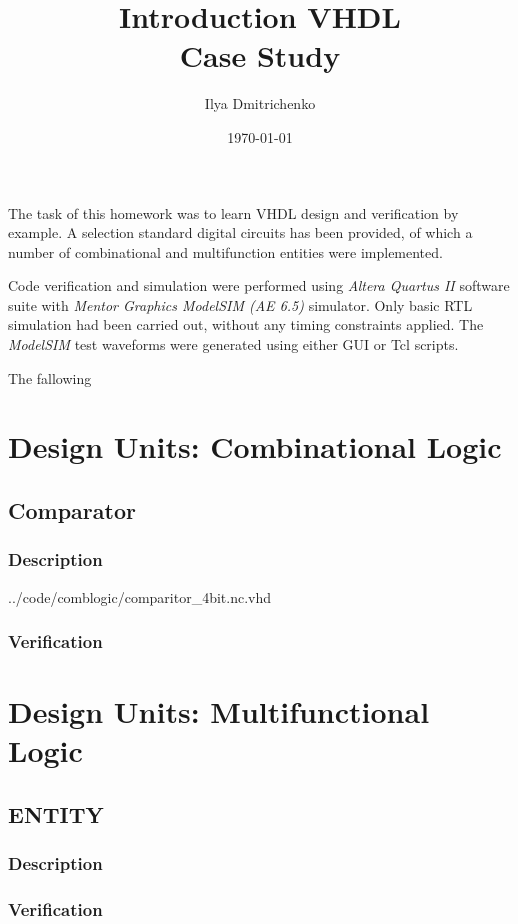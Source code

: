 \documentclass[10pt,a4paper]{report}
\author{Ilya Dmitrichenko}
\title{Introduction VHDL \\ Case Study}
\date{\today}
\begin{document}
\maketitle

\foreword

 The task of this homework was to learn
 VHDL design and verification by example.
 A selection standard digital circuits
 has been provided, of which a number
 of combinational and multifunction
 entities were implemented.

 Code verification and simulation were
 performed using \emph{Altera Quartus II}
 software suite with \emph{Mentor Graphics
 ModelSIM (AE 6.5)} simulator.
 Only basic RTL simulation had been
 carried out, without any timing constraints
 applied. The \emph{ModelSIM} test waveforms
 were generated using either GUI or Tcl scripts.

 The fallowing 


\chapter{Design Units: Combinational Logic}

\section{Comparator}

\subsection{Description}


{../code/comblogic/comparitor_4bit.nc.vhd}

\subsection{Verification}

\chapter{Design Units: Multifunctional Logic}

\section{ENTITY}

\subsection{Description}

%

\subsection{Verification}
\end{document}
